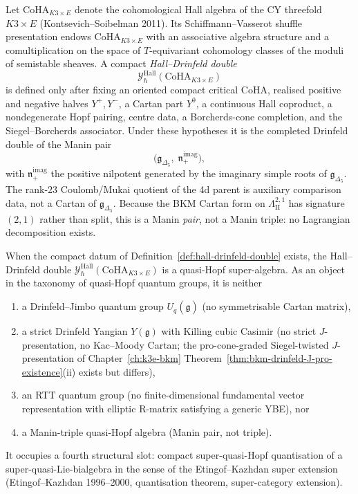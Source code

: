 \begin{definition}
\label{def:hall-drinfeld-double}
Let $\mathrm{CoHA}_{K3\times E}$ denote the cohomological Hall algebra of the CY
threefold $K3\times E$ (Kontsevich--Soibelman 2011). Its Schiffmann--Vasserot shuffle
presentation endows $\mathrm{CoHA}_{K3\times E}$ with an associative algebra structure
and a comultiplication on the space of $T$-equivariant cohomology classes of the
moduli of semistable sheaves. A compact \emph{Hall--Drinfeld double}
\[
 \mathcal{Y}^{\mathrm{Hall}}_\hbar(\mathrm{CoHA}_{K3\times E})
\]
is defined only after fixing an oriented compact critical CoHA, realised
positive and negative halves \(Y^+,Y^-\), a Cartan part \(Y^0\), a
continuous Hall coproduct, a nondegenerate Hopf pairing, centre data, a
Borcherds-cone completion, and the Siegel--Borcherds associator. Under
these hypotheses it is the completed Drinfeld double of the Manin pair
\[
 \bigl(\mathfrak{g}_{\Delta_5},\;
 \mathfrak{n}_{+}^{\mathrm{imag}}\bigr),
\]
with $\mathfrak{n}_+^{\mathrm{imag}}$ the positive nilpotent generated by the imaginary
simple roots of $\mathfrak{g}_{\Delta_5}$. The rank-$23$ Coulomb/Mukai
quotient of the 4d parent is auxiliary comparison data, not a Cartan of
\(\mathfrak g_{\Delta_5}\). Because the BKM Cartan form on
\(\Lambda^{2,1}_{\mathrm{II}}\) has signature \((2,1)\) rather than
split, this is a Manin \emph{pair}, not a Manin triple: no Lagrangian
decomposition exists.
\end{definition}

\begin{theorem}
\label{thm:fourth-kind-quantum-group}
When the compact datum of Definition~\ref{def:hall-drinfeld-double}
exists, the Hall--Drinfeld double
\(\mathcal{Y}^{\mathrm{Hall}}_\hbar(\mathrm{CoHA}_{K3\times E})\)
is a quasi-Hopf super-algebra. As an object in the taxonomy of quasi-Hopf
quantum groups, it is neither
\begin{enumerate}[label=\textup{(\alph*)}]
\item a Drinfeld--Jimbo quantum group $U_q(\widehat{\mathfrak{g}})$ (no symmetrisable
 Cartan matrix),
\item a strict Drinfeld Yangian $Y(\mathfrak{g})$ with Killing cubic Casimir
 (no strict $J$-presentation, no Kac--Moody Cartan; the pro-cone-graded
 Siegel-twisted $J$-presentation of
 Chapter~\ref{ch:k3e-bkm} Theorem~\ref{thm:bkm-drinfeld-J-pro-existence}(ii)
 exists but differs),
\item an RTT quantum group (no finite-dimensional fundamental vector representation
 with elliptic R-matrix satisfying a generic YBE), nor
\item a Manin-triple quasi-Hopf algebra (Manin pair, not triple).
\end{enumerate}
It occupies a fourth structural slot: compact super-quasi-Hopf quantisation of a
super-quasi-Lie-bialgebra in the sense of the Etingof--Kazhdan super extension
(Etingof--Kazhdan 1996--2000, quantisation theorem, super-category extension).
\end{theorem}

